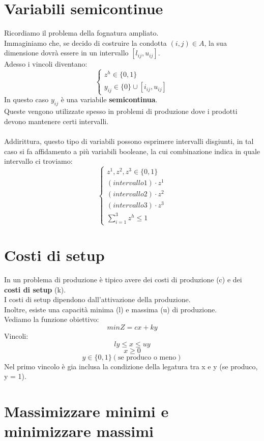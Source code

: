 \documentclass[12pt,a4paper]{article}
\let\oldsection\section
\renewcommand{\section}{\clearpage\oldsection}
\begin{document}
\section{Variabili semicontinue}
Ricordiamo il problema della fognatura ampliato.\\
Immaginiamo che, se decido di costruire la condotta $(i,j) \in A$, la sua dimensione dovrà essere in un intervallo $[l_{ij},u_{ij}]$.\\
Adesso i vincoli diventano:
\[
\begin{cases}
    z^h \in \{0,1\}\\
    y_{ij} \in \{0\} \cup [i_{ij},u_{ij}]
\end{cases}
\]
In questo caso $y_{ij}$ è una variabile \textbf{semicontinua}.\\
Queste vengono utilizzate spesso in problemi di produzione dove i prodotti devono mantenere certi intervalli.\\\\
Addirittura, questo tipo di variabili possono esprimere intervalli disgiunti, in tal caso si fa affidamento a più variabili booleane, la cui combinazione indica in quale intervallo ci troviamo:
\[
\begin{cases}
    z^1, z^2, z^3 \in \{0,1\}\\
    (intervallo1) \cdot z^1\\
    (intervallo2) \cdot z^2\\
    (intervallo3) \cdot z^3\\
    \sum_{i = 1}^{3} z^h \leq 1
\end{cases}
\]


\section{Costi di setup}
In un problema di produzione è tipico avere dei costi di produzione (c) e dei \textbf{costi di setup} (k).\\
I costi di setup dipendono dall'attivazione della produzione.\\
Inoltre, esiste una capacità minima (l) e massima (u) di produzione.\\
Vediamo la funzione obiettivo:
\[
minZ = cx + ky
\]
Vincoli:
\[
ly \leq x \leq uy
\]
\[
x \geq 0
\]
\[
y \in \{0,1\} (\text{se produco o meno})
\]
Nel primo vincolo è gia inclusa la condizione della legatura tra x e y (se produco, y = 1).


\section{Massimizzare minimi e minimizzare massimi}
\end{document}
